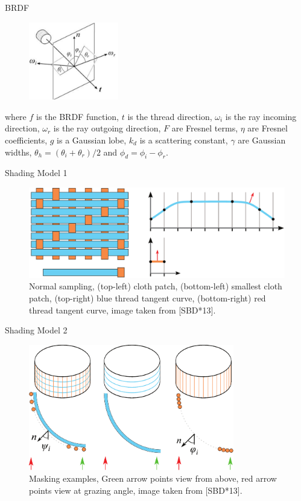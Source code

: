 \documentclass{beamer}
\begin{document}
\begin{frame}{BRDF}
\begin{multicols}{2}
\begin{figure}[b!]
\includegraphics[width=0.35\textwidth]{img/cloth_directions}
\end{figure}

\footnotesize{where $f$ is the BRDF function, $t$ is the thread direction, $\omega_i$ is the ray incoming direction, $\omega_r$ is the ray outgoing direction, $F$ are Fresnel terms, $\eta$ are Fresnel coefficients, $g$ is a Gaussian lobe, $k_d$ is a scattering constant, $\gamma$ are Gaussian widths, $\theta_h = (\theta_i+\theta_r)/2$ and $\phi_d = \phi_i-\phi_r$. }
\end{multicols}

\end{frame}

\begin{frame}{Shading Model 1}
\begin{figure}[b!]
\includegraphics[width=\textwidth]{img/tanget_curve}
\caption*{\tiny{Normal sampling, (top-left) cloth patch, (bottom-left) smallest cloth patch, (top-right) blue thread tangent curve, (bottom-right) red thread tangent curve, image taken from [SBD*13].}}
\end{figure}
\end{frame}

\begin{frame}{Shading Model 2}
\begin{figure}[b!]
\includegraphics[width=0.8\textwidth]{img/masking}
\caption*{\tiny{Masking examples, Green arrow points view from above, red arrow points view at grazing angle, image taken from [SBD*13].}}
\end{figure}
\end{frame}
\end{document}
